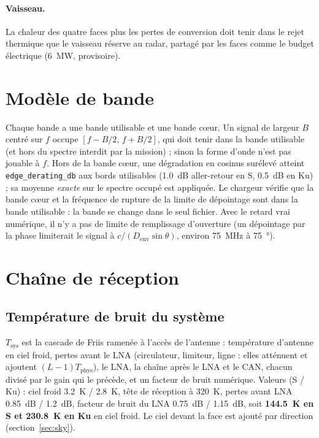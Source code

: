 \documentclass[11pt,a4paper]{article}
\newcommand{\Tsys}{T_{\mathrm{sys}}}
\newcommand{\Denv}{D_{\mathrm{env}}}
\begin{document}
\paragraph{Vaisseau.} La chaleur des quatre faces plus les pertes de conversion doit tenir dans le rejet thermique que
le vaisseau réserve au radar, partagé par les faces comme le budget électrique (\SI{6}{MW}, provisoire).

\section{Modèle de bande}
Chaque bande a une bande utilisable et une bande c\oe{}ur. Un signal de largeur $B$ centré sur $f$ occupe
$[f-B/2,\,f+B/2]$, qui doit tenir dans la bande utilisable (et hors du spectre interdit par la mission) ; sinon la
forme d'onde n'est pas jouable à $f$. Hors de la bande c\oe{}ur, une dégradation en cosinus surélevé atteint
\texttt{edge\_derating\_db} aux bords utilisables (\SI{1.0}{dB} aller-retour en S, \SI{0.5}{dB} en Ku) ; sa moyenne
\emph{exacte} sur le spectre occupé est appliquée. Le chargeur vérifie que la bande c\oe{}ur et la fréquence de rupture de
la limite de dépointage sont dans la bande utilisable : la bande se change dans le seul fichier. Avec le retard vrai
numérique, il n'y a pas de limite de remplissage d'ouverture (un dépointage par la phase limiterait le signal à
$c/(\Denv\sin\theta)$, environ \SI{75}{MHz} à \SI{75}{\degree}).

\section{Chaîne de réception}\label{sec:rx}

\subsection{Température de bruit du système}
$\Tsys$ est la cascade de Friis ramenée à l'accès de l'antenne : température d'antenne en ciel froid, pertes avant le
LNA (circulateur, limiteur, ligne : elles atténuent et ajoutent $(L-1)T_{\mathrm{phys}}$), le LNA, la chaîne après le
LNA et le CAN, chacun divisé par le gain qui le précède, et un facteur de bruit numérique. Valeurs (S / Ku) : ciel froid
\SI{3.2}{K} / \SI{2.8}{K}, tête de réception à \SI{320}{K}, pertes avant LNA \SI{0.85}{dB} / \SI{1.2}{dB}, facteur de
bruit du LNA \SI{0.75}{dB} / \SI{1.15}{dB}, soit \textbf{\SI{144.5}{K} en S et \SI{230.8}{K} en Ku} en ciel froid. Le
ciel devant la face est ajouté par direction (section~\ref{sec:sky}).
\end{document}
